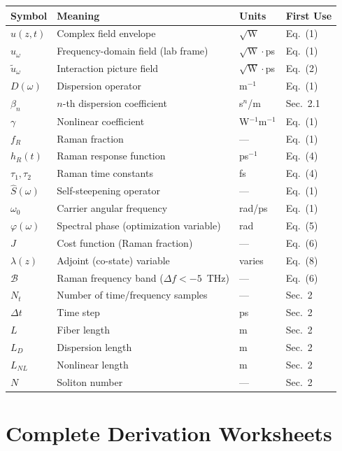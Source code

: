 \documentclass[12pt,a4paper]{article}
\theoremstyle{definition}
\begin{document}
{\small
\begin{longtable}{p{2.5cm}p{6cm}p{2.5cm}p{2cm}}
\toprule
\textbf{Symbol} & \textbf{Meaning} & \textbf{Units} & \textbf{First Use} \\
\midrule
\endhead

$u(z,t)$ & Complex field envelope & $\sqrt{\text{W}}$ & Eq.~(1) \\
$\hat{u}_\omega$ & Frequency-domain field (lab frame) & $\sqrt{\text{W}}\cdot$ps & Eq.~(1) \\
$\tilde{u}_\omega$ & Interaction picture field & $\sqrt{\text{W}}\cdot$ps & Eq.~(2) \\
$D(\omega)$ & Dispersion operator & m$^{-1}$ & Eq.~(1) \\
$\beta_n$ & $n$-th dispersion coefficient & s$^n$/m & Sec.~2.1 \\
$\gamma$ & Nonlinear coefficient & W$^{-1}$m$^{-1}$ & Eq.~(1) \\
$f_R$ & Raman fraction & --- & Eq.~(1) \\
$h_R(t)$ & Raman response function & ps$^{-1}$ & Eq.~(4) \\
$\tau_1, \tau_2$ & Raman time constants & fs & Eq.~(4) \\
$\hat{S}(\omega)$ & Self-steepening operator & --- & Eq.~(1) \\
$\omega_0$ & Carrier angular frequency & rad/ps & Eq.~(1) \\
$\varphi(\omega)$ & Spectral phase (optimization variable) & rad & Eq.~(5) \\
$J$ & Cost function (Raman fraction) & --- & Eq.~(6) \\
$\lambda(z)$ & Adjoint (co-state) variable & varies & Eq.~(8) \\
$\mathcal{B}$ & Raman frequency band ($\Delta f < -5$~THz) & --- & Eq.~(6) \\
$N_t$ & Number of time/frequency samples & --- & Sec.~2 \\
$\Delta t$ & Time step & ps & Sec.~2 \\
$L$ & Fiber length & m & Sec.~2 \\
$L_D$ & Dispersion length & m & Sec.~2 \\
$L_{NL}$ & Nonlinear length & m & Sec.~2 \\
$N$ & Soliton number & --- & Sec.~2 \\

\bottomrule
\end{longtable}
}


\section{Complete Derivation Worksheets}
\label{app:derivations}
\end{document}
